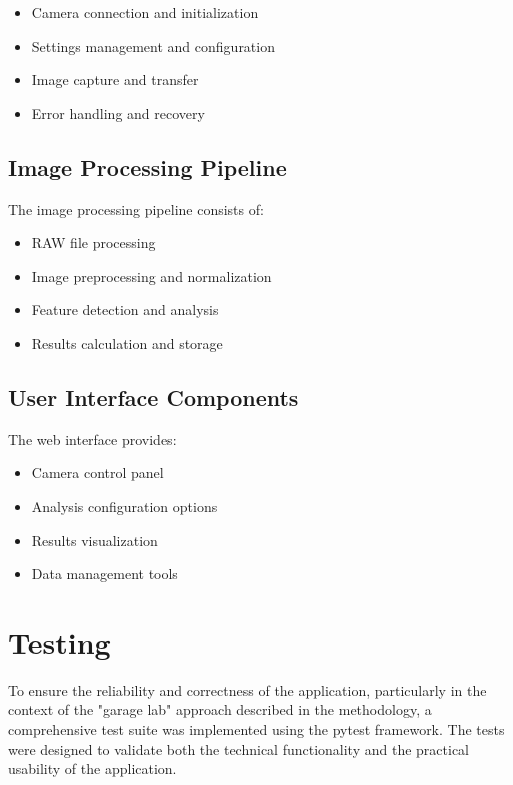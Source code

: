 \begin{itemize}
    \item Camera connection and initialization
    \item Settings management and configuration
    \item Image capture and transfer
    \item Error handling and recovery
\end{itemize}

\subsection{Image Processing Pipeline}
The image processing pipeline consists of:

\begin{itemize}
    \item RAW file processing
    \item Image preprocessing and normalization
    \item Feature detection and analysis
    \item Results calculation and storage
\end{itemize}

\subsection{User Interface Components}
The web interface provides:

\begin{itemize}
    \item Camera control panel
    \item Analysis configuration options
    \item Results visualization
    \item Data management tools
\end{itemize}

\section{Testing}

To ensure the reliability and correctness of the application, particularly in the context of the "garage lab" approach described in the methodology, a comprehensive test suite was implemented using the pytest framework. The tests were designed to validate both the technical functionality and the practical usability of the application.

